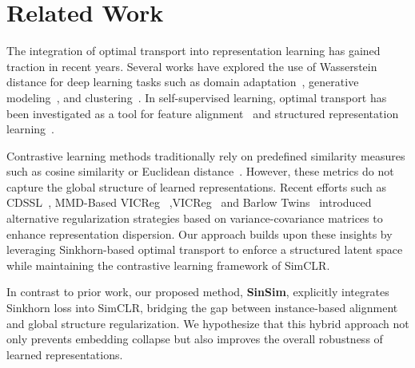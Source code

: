 \section{Related Work}
The integration of optimal transport into representation learning has gained traction in recent years. Several works have explored the use of Wasserstein distance for deep learning tasks such as domain adaptation~\cite{courty2017optimal, flamary2016optimal, damodaran2018deepjdot}, generative modeling~\cite{arjovsky2017wasserstein,tolstikhin2018wasserstein,gulrajani2017improved}, and clustering~\cite{genevay2019learning,fatras2021unbalanced,cuturi2014fast}. In self-supervised learning, optimal transport has been investigated as a tool for feature alignment~\cite{fatras2021unbalanced,perrot2016mapping,schmitz2018wasserstein} and structured representation learning~\cite{patrini2020sinkhorn,genevay2018learning,asano2019self}.

Contrastive learning methods traditionally rely on predefined similarity measures such as cosine similarity or Euclidean distance~\cite{kumar2022contrastive}. However, these metrics do not capture the global structure of learned representations. Recent efforts such as CDSSL~\cite{sepanj2025self}, MMD-Based VICReg~\cite{sepanj2024aligning} ,VICReg~\cite{bardes2021vicreg} and Barlow Twins~\cite{zbontar2021barlow} introduced alternative regularization strategies based on variance-covariance matrices to enhance representation dispersion. Our approach builds upon these insights by leveraging Sinkhorn-based optimal transport to enforce a structured latent space while maintaining the contrastive learning framework of SimCLR.

In contrast to prior work, our proposed method, \textbf{SinSim}, explicitly integrates Sinkhorn loss into SimCLR, bridging the gap between instance-based alignment and global structure regularization. We hypothesize that this hybrid approach not only prevents embedding collapse but also improves the overall robustness of learned representations.